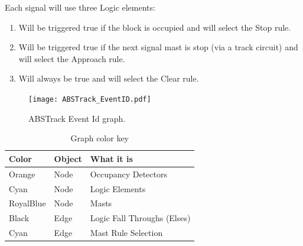 Each signal will use three Logic elements:

\begin{enumerate}
\item Will be triggered true if the block is occupied and will select the Stop 
rule.
\item Will be triggered true if the next signal mast is stop (via a track 
circuit) and will select the Approach rule.
\item Will always be true and will select the Clear rule.
\end{enumerate}

\begin{figure}[hbpt]\begin{centering}%
\texttt{[image: ABSTrack\_EventID.pdf]}
\caption{ABSTrack Event Id graph.}
\label{fig:ABSTrackEventID}
\end{centering}\end{figure}
\begin{table}[hbpt]\begin{centering}%
\begin{tabular}{|l|l|p{2in}|}
\hline
Color&Object&What it is\\
\hline
Orange&Node&Occupancy Detectors\\
\hline
Cyan&Node&Logic Elements\\
\hline
RoyalBlue&Node&Masts\\
\hline 
Black&Edge&Logic Fall Throughs (Elses)\\
\hline
Cyan&Edge&Mast Rule Selection\\
\hline
\end{tabular}
\caption{Graph color key}
\label{tab:ExampleSidingCP1EventFlow}
\end{centering}\end{table}
                                        
